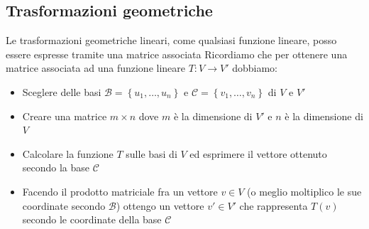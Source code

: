 \subsection{Trasformazioni geometriche}
Le trasformazioni geometriche lineari, come qualsiasi funzione lineare, posso essere espresse tramite una matrice associata
\vskip3mm
Ricordiamo che per ottenere una matrice associata ad una funzione lineare $ T : V \to V' $ dobbiamo:
\begin{itemize}
	\item Sceglere delle basi $ \mathcal{B} = \left\{ u_1,\ldots,u_n \right\} $ e $ \mathcal{C}= \left\{ v_1,\ldots,v_n \right\}  $	di $ V $ e $ V' $
	\item Creare una matrice $ m \times n $ dove $ m $ è la dimensione di $ V' $ e $ n $ è la dimensione di $ V $
	\item Calcolare la funzione $ T $ sulle basi di $ V $ ed esprimere il vettore ottenuto secondo la base $ \mathcal{C} $
	\item Facendo il prodotto matriciale fra un vettore $ v \in  V $ (o meglio moltiplico le sue coordinate secondo $ \mathcal{B} $) ottengo un vettore $ v' \in  V' $ che rappresenta $ T\left( v \right)  $ secondo le coordinate della base $ \mathcal{C} $
\end{itemize}

